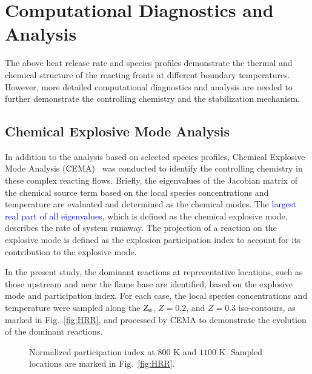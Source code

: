 \documentclass[review,3p,times]{elsarticle}
\begin{document}
\section{Computational Diagnostics and Analysis} \label{sec:diagnostics}
The above heat release rate and species profiles demonstrate the thermal and chemical structure of the reacting fronts at different boundary temperatures.  However, more detailed computational diagnostics and analysis are needed to further demonstrate the controlling chemistry and the stabilization mechanism.
\subsection{Chemical Explosive Mode Analysis}
In addition to the analysis based on selected species profiles, Chemical Explosive Mode Analysis (CEMA)~\cite{lu10,shan12} was conducted to identify the controlling chemistry in these complex reacting flows.  Briefly, the eigenvalues of the Jacobian matrix of the chemical source term based on the local species concentrations and temperature are evaluated and determined as the chemical modes.  The \textcolor{blue}{largest real part of all eigenvalues}, which is defined as the chemical explosive mode, describes the rate of system runaway.  The projection of a reaction on the explosive mode is defined as the explosion participation index to account for its contribution to the explosive mode.  

In the present study, the dominant reactions at representative locations, such as those upstream and near the flame base are identified, based on the explosive mode and participation index.  For each case, the local species concentrations and temperature were sampled along the $Z_{\rm st}$, $Z = 0.2$, and $Z = 0.3$ iso-contours, as marked in Fig.~\ref{fig:HRR}, and processed by CEMA to demonstrate the evolution of the dominant reactions.

\begin{figure}
  \centering
  \scriptsize
  
  
  \normalsize
  \caption{Normalized participation index at $800$ K and $1100$ K.  Sampled locations are marked in Fig.~\ref{fig:HRR}.}
  \label{fig:CEMA}
\end{figure}
\end{document}
